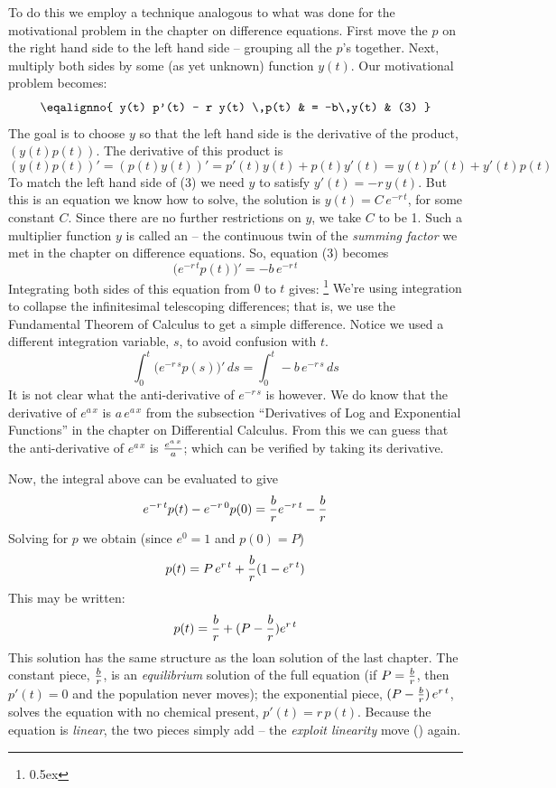 To do this we employ a technique analogous to what was 
done for the motivational problem in the chapter on difference equations.
First move the $p$ on the right hand side to the left hand side -- grouping 
all the $p$'s together. Next, 
multiply both sides by some (as yet unknown) function $y(t)$. Our motivational problem becomes:
$$
\eqalignno{
 y(t)  p'(t) - r y(t) \,p(t) & = -b\,y(t) & (3)
}
$$
The goal is to choose $y$ so that the left hand side is the derivative of the product, $(y(t) p(t))$.
The derivative of this product is
$$
(y(t) p(t))' = (p(t) y(t))' = p'(t) y(t) + p(t) y'(t) = y(t) p'(t) + y'(t) p(t)
$$
To match the left hand side of (3) we need $y$ to satisfy $y'(t) = -r \, y(t)$.
But this is an equation we know how to solve, the solution is $y(t) = C\, e^{-r\, t}$, for some constant $C$.
Since there are no further restrictions on $y$, we take $C$ to be 1.
Such a multiplier function $y$ is called an {\it {}\/} --
the continuous twin of the {\it summing factor\/} we met in the chapter on
difference equations.
So, equation (3) becomes
$$
\big(e^{-r \, t}p(t)\big)' = -b\, e^{-r \, t}
$$
Integrating both sides of this equation from $0$ to $t$ gives:%
\footnote{\kern 0.5pt \raise 0.5ex \hbox{\dag}}%
{We're using integration to collapse the infinitesimal telescoping differences; that is, 
we use the Fundamental Theorem of Calculus to get a simple difference. 
Notice we used a different integration variable, $s$, to avoid confusion with $t$.}
$$
\int_0^t \big(e^{-r \, s}p(s)\big)' \, ds = \int_0^t -b\, e^{-r \, s} \, ds
$$
It is not clear what the anti-derivative of $e^{-r \, s}$ is however. We do know that the derivative 
of $e^{a\, x}$ is $a\, e^{a \, x}$ from the subsection ``Derivatives of Log
and Exponential Functions'' in the chapter on Differential Calculus. From this we can guess that the anti-derivative of $e^{a\, x}$ is ${e^{a \, x} \over a}$;
which can be verified by taking its derivative.

Now, the integral above can be evaluated to give
$$
e^{-r\, t}p(t) - e^{ -r \, 0} p(0) = {b \over r} e^{-r \, t} - {b \over r}
$$
Solving for $p$ we obtain (since $e^0 = 1$ and $p(0) = P$)
$$
p(t) = P\, e^{r \, t} +  {b \over r}(1 - e^{r \, t})
$$
This may be written:
$$
p(t) = {b \over r} + (P - {b \over r}) e^{r \, t}
$$
This solution has the same structure as the loan solution of the last chapter.
The constant piece, ${b \over r}$, is an {\it equilibrium\/} solution of the
full equation (if $P = {b \over r}$, then $p'(t) = 0$ and the population never
moves); the exponential piece, $(P - {b \over r})\, e^{r \, t}$, solves the
equation with no chemical present, $p'(t) = r \, p(t)$. Because the equation is
{\it linear\/}, the two pieces simply add -- the {\it exploit linearity\/}
move ({\it {}\/}) again.


